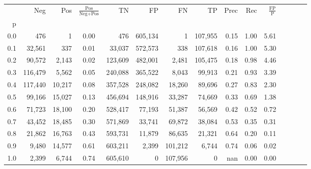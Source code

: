\begin{tabular}{rrrcrrrrrrrrrrr}
\toprule
{} &      Neg &     Pos & $\frac{\text{Pos}}{\text{Neg}+\text{Pos}}$ &       TN &       FP &       FN &       TP &  Prec &   Rec & $\frac{\text{FP}}{\text{P}}$ \\
p   &          &         &                                            &          &          &          &          &       &       &                              \\
\midrule
0.0 &      476 &       1 &                                       0.00 &      476 &  605,134 &        1 &  107,955 &  0.15 &  1.00 &                         5.61 \\
0.1 &   32,561 &     337 &                                       0.01 &   33,037 &  572,573 &      338 &  107,618 &  0.16 &  1.00 &                         5.30 \\
0.2 &   90,572 &   2,143 &                                       0.02 &  123,609 &  482,001 &    2,481 &  105,475 &  0.18 &  0.98 &                         4.46 \\
0.3 &  116,479 &   5,562 &                                       0.05 &  240,088 &  365,522 &    8,043 &   99,913 &  0.21 &  0.93 &                         3.39 \\
0.4 &  117,440 &  10,217 &                                       0.08 &  357,528 &  248,082 &   18,260 &   89,696 &  0.27 &  0.83 &                         2.30 \\
0.5 &   99,166 &  15,027 &                                       0.13 &  456,694 &  148,916 &   33,287 &   74,669 &  0.33 &  0.69 &                         1.38 \\
0.6 &   71,723 &  18,100 &                                       0.20 &  528,417 &   77,193 &   51,387 &   56,569 &  0.42 &  0.52 &                         0.72 \\
0.7 &   43,452 &  18,485 &                                       0.30 &  571,869 &   33,741 &   69,872 &   38,084 &  0.53 &  0.35 &                         0.31 \\
0.8 &   21,862 &  16,763 &                                       0.43 &  593,731 &   11,879 &   86,635 &   21,321 &  0.64 &  0.20 &                         0.11 \\
0.9 &    9,480 &  14,577 &                                       0.61 &  603,211 &    2,399 &  101,212 &    6,744 &  0.74 &  0.06 &                         0.02 \\
1.0 &    2,399 &   6,744 &                                       0.74 &  605,610 &        0 &  107,956 &        0 &   nan &  0.00 &                         0.00 \\
\bottomrule
\end{tabular}
